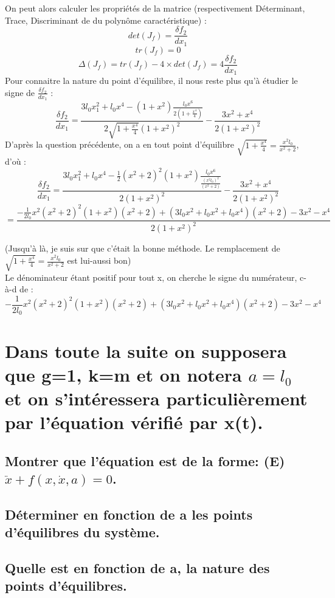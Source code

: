 \documentclass[10pt,a4paper]{article}
\begin{document}
On peut alors calculer les propriétés de la matrice (respectivement Déterminant, Trace, Discriminant de du polynôme caractéristique) :\\
\[ det(J_f) =  \frac{\delta f_2}{dx_1} \]
\[ tr(J_f) = 0 \]
\[ \Delta(J_f) = tr(J_f) - 4\times det(J_f) = 4\frac{\delta f_2}{dx_1}\]
Pour connaitre la nature du point d'équilibre, il nous reste plus qu'à étudier le signe de $\frac{\delta f_2}{dx_1}$ :\\
\[ \frac{\delta f_2}{dx_1} = \frac{3l_0x_1^2+l_0x^4 - (1+x^2)\frac{l_0x^6}{2(1+\frac{x^4}{4})}}{2\sqrt{1+\frac{x^4}{4}}(1+x^2)^2}-\frac{3x^2+x^4}{2(1+x^2)^2} \]
D'après la question précédente, on a en tout point d'équilibre $\sqrt{1+\frac{x^4}{4}}=\frac{x^2l_0}{x^2+2}$, d'où : \\
\[ \frac{\delta f_2}{dx_1} = \frac{3l_0x_1^2+l_0x^4 - \frac{1}{2}(x^2+2)^2(1+x^2)\frac{l_0x^6}{\frac{(x^2l_0)^2}{(x^2+2)}}}{2(1+x^2)^2}-\frac{3x^2+x^4}{2(1+x^2)^2} \]
\[ =\frac{-\frac{1}{2l_0}x^2(x^2+2)^2(1+x^2)(x^2+2)+(3l_0x^2+l_0x^2+l_0x^4)(x^2+2)-3x^2-x^4}{2(1+x^2)^2} \]

(Jusqu'à là, je suis sur que c'était la bonne méthode. Le remplacement de $\sqrt{1+\frac{x^4}{4}}=\frac{x^2l_0}{x^2+2}$ est lui-aussi bon) \\

Le dénominateur étant positif pour tout x, on cherche le signe du numérateur, c-à-d de :\\
\[ -\frac{1}{2l_0}x^2(x^2+2)^2(1+x^2)(x^2+2)+(3l_0x^2+l_0x^2+l_0x^4)(x^2+2)-3x^2-x^4 \]



\section{Dans toute la suite on supposera que g=1, k=m et on notera $a=l_0$ et on s'intéressera particulièrement par l'équation vérifié par x(t).}
\subsection{Montrer que l'équation est de la forme: (E) $\ddot{x} + f(x,\dot{x},a) = 0$.}
\subsection{Déterminer en fonction de a les points d'équilibres du système.}
\subsection{Quelle est en fonction de a, la nature des points d'équilibres.}
\end{document}
